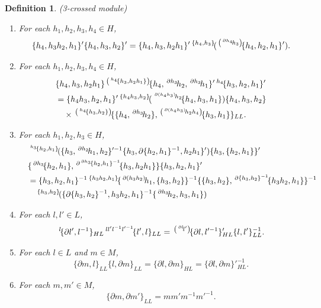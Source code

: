 \documentclass{tac}
\newtheorem{dfn}{Definition}
\newcommand{\act}[1]{\,\sp{#1}\!}
\begin{document}
\begin{dfn}{(3-crossed module)}
\begin{enumerate}
  \item For each $h_1,h_2,h_3,h_4 \in H$,
 \[
\{h_4,h_3h_2,h_1\}'\{h_4,h_3,h_2\}' = \{h_4,h_3,h_2h_1\}'\act{\{h_4,h_3\}}(\act{\left(\act{\partial h_4}h_3\right)}\{h_4,h_2,h_1\}') .
 \]
 \label{rhmnr}

    \item For each $h_1,h_2,h_3,h_4 \in H$,
 \begin{align*}
&\{h_4,h_3,h_2h_1\}\act{\left(\act{h_4}\{h_3,h_2h_1\}\right)}\{h_4,\act{\partial h_3}h_2,\act{\partial h_3}h_1\}'\act{h_4}\{h_3,h_2,h_1\}' \\
  &= \{h_4h_3,h_2,h_1\}'\act{\{h_4h_3,h_2\}}(\act{\act{\partial (h_4h_3)}h_2}\{h_4,h_3,h_1\})\{h_4,h_3,h_2\} \\
   &\hspace{1em}\times\act{\left(\act{h_4}\{h_3,h_2\}\right)}\{\{h_4,\act{\partial h_3}h_2\},\act{\left(\act{\partial(h_4h_3)}h_2h_4\right)}\{h_3,h_1\}\}_{LL}.
\end{align*}
 \label{lrhmnr}
 
  \item For each $h_1,h_2,h_3 \in H$,
  \label{yanBt}
 \begin{align}
  \nonumber
 &\act{\act{h_3}\{h_2,h_1\}}(\{h_3,\act{\partial h_2}h_1,h_2\}'^{-1}\{h_3,\partial\{h_2,h_1\}^{-1},h_2h_1\}')\{h_3,\{h_2,h_1\}\}' \\
  \nonumber
  \hspace{1em} &\{\act{\partial h_3}\{h_2,h_1\},\act{\partial\act{\partial h_3}\{h_2,h_1\}^{-1}}\{h_3,h_2h_1\}\}\{h_3,h_2,h_1\}' \\
  \nonumber
  &= \{h_3,h_2,h_1\}^{-1}\act{\{h_3h_2,h_1\}}\{\act{\partial(h_3h_2)}h_1,\{h_3,h_2\}\}^{-1}\{\{h_3,h_2\},\act{\partial\{h_3,h_2\}^{-1}}\{h_3h_2,h_1\}\}^{-1} \\
  \nonumber
  &\hspace{1em} \act{\{h_3,h_2\}}(\{\partial\{h_3,h_2\}^{-1},h_3h_2,h_1\}^{-1}\{\act{\partial h_3}h_2,h_3,h_1\})
\end{align}
 
 
 
 
 
 
    \item For each $l,l' \in L$,
    \[
    \act{l}\{\partial l',l^{-1}\}_{HL}\act{ll'l^{-1}l'^{-1}}\{l',l\}_{LL}= \act{\left(\act{\partial l}l'\right)}\{\partial l,l'^{-1}\}'_{HL}\{l,l'\}^{-1}_{LL}.
    \]
     \item For each $l\in L$ and $m \in M$,
    \[
    \{\partial m,l\}_{LL}\{l,\partial m\}_{LL} = \{\partial l,\partial m\}_{HL} = \{\partial l,\partial m\}'^{-1}_{HL}.
    \]
    \label{rllandhl}
        \item For each $m,m' \in M$,
    \[
    \{\partial m,\partial m'\}_{LL} = mm'm^{-1}m'^{-1}.
    \]   
\label{3cm_not_need}
\end{enumerate}
\end{dfn}
\end{document}
